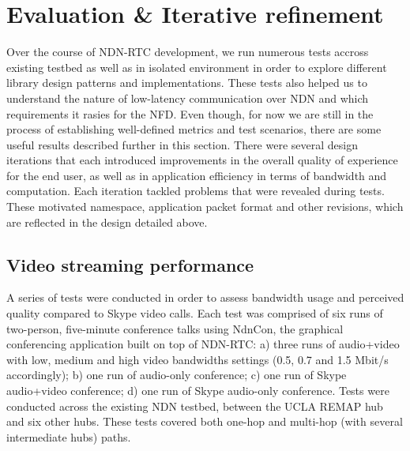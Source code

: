 \documentclass{icn/sig-alternate-2013} %
\newcommand{\ndnrtcName}{NDN-RTC} %
\newcommand{\ndnconName}{NdnCon}
\begin{document}
\section{Evaluation \& Iterative refinement}
\label{sec:eval} 
Over the course of \ndnrtcName{} development, we run numerous tests accross existing testbed as well as in isolated environment in order to explore different library design patterns and implementations. These tests also helped us to understand the nature of low-latency communication over NDN and which requirements it rasies for the NFD. Even though, for now we are still in the process of establishing well-defined metrics and test scenarios, there are some useful results described further in this section.
There were several  design iterations that each introduced improvements in the overall quality of experience for the end user, as well as in application efficiency in terms of bandwidth and computation. Each iteration tackled problems that were revealed during tests.  These motivated namespace, application packet format and other revisions, which are reflected in the design detailed above.%

\subsection{Video streaming performance}
A series of tests were conducted in order to assess bandwidth usage and perceived quality compared to Skype video calls. Each test was comprised of six runs of two-person, five-minute conference talks using \ndnconName{}, the graphical conferencing application built on top of \ndnrtcName{}: a) three runs of audio+video with low, medium and high video bandwidths settings (0.5, 0.7 and 1.5 Mbit/s accordingly); b) one run of audio-only conference; c) one run of Skype audio+video conference; d) one run of Skype audio-only conference. Tests were conducted across the existing NDN testbed, between the UCLA REMAP hub and six other hubs.  These tests covered both one-hop and multi-hop (with several intermediate hubs) paths. 

\end{document}
